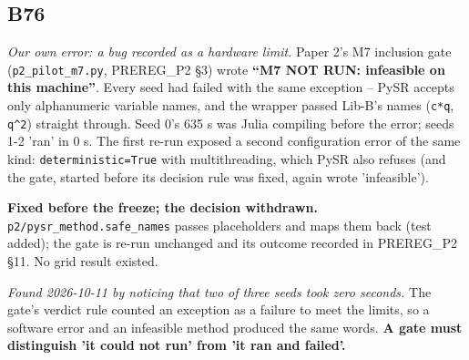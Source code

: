 \documentclass[10pt]{article}
\begin{document}
\subsection*{B76}\label{led:B76}
\begin{description}[leftmargin=0pt,itemsep=1pt]
\item[Defect.] \emph{Our own error: a bug recorded as a hardware limit.} Paper 2's M7 inclusion gate (\texttt{p2\_pilot\_m7.py}, PREREG\_P2 §3) wrote \textbf{``M7 NOT RUN: infeasible on this machine''}. Every seed had failed with the same exception -- PySR accepts only alphanumeric variable names, and the wrapper passed Lib-B's names (\texttt{c*q}, \texttt{q\textasciicircum{}2}) straight through. Seed 0's 635 s was Julia compiling before the error; seeds 1-2 'ran' in 0 s. The first re-run exposed a second configuration error of the same kind: \texttt{deterministic=True} with multithreading, which PySR also refuses (and the gate, started before its decision rule was fixed, again wrote 'infeasible').
\item[Resolution.] \textbf{Fixed before the freeze; the decision withdrawn.} \texttt{p2/pysr\_method.safe\_names} passes placeholders and maps them back (test added); the gate is re-run unchanged and its outcome recorded in PREREG\_P2 §11. No grid result existed.
\item[Note.] \emph{Found 2026-10-11 by noticing that two of three seeds took zero seconds.} The gate's verdict rule counted an exception as a failure to meet the limits, so a software error and an infeasible method produced the same words. \textbf{A gate must distinguish 'it could not run' from 'it ran and failed'.}
\end{description}
\end{document}
